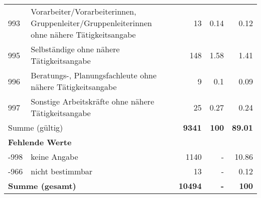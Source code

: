 \begin{longtable}{lXrrr}
        993 & \multicolumn{1}{X}{Vorarbeiter/Vorarbeiterinnen, Gruppenleiter/Gruppenleiterinnen ohne nähere Tätigkeitsangabe} & %
          \num{13} &
          \num[round-mode=places,round-precision=2]{0.14} &
          \num[round-mode=places,round-precision=2]{0.12} \\

        995 & \multicolumn{1}{X}{Selbständige ohne nähere Tätigkeitsangabe} & %
          \num{148} &
          \num[round-mode=places,round-precision=2]{1.58} &
          \num[round-mode=places,round-precision=2]{1.41} \\

        996 & \multicolumn{1}{X}{Beratungs-, Planungsfachleute ohne nähere Tätigkeitsangabe} & %
          \num{9} &
          \num[round-mode=places,round-precision=2]{0.1} &
          \num[round-mode=places,round-precision=2]{0.09} \\

        997 & \multicolumn{1}{X}{Sonstige Arbeitskräfte ohne nähere Tätigkeitsangabe} & %
          \num{25} &
          \num[round-mode=places,round-precision=2]{0.27} &
          \num[round-mode=places,round-precision=2]{0.24} \\

     \midrule
     \multicolumn{2}{l}{Summe (gültig)} &
       \textbf{\num{9341}} &
     \textbf{\num{100}} &
       \textbf{\num[round-mode=places,round-precision=2]{89.01}} \\
     \multicolumn{5}{l}{\textbf{Fehlende Werte}}\\
       -998 &
       keine Angabe &
         \num{1140} &
        - &
         \num[round-mode=places,round-precision=2]{10.86} \\
       -966 &
       nicht bestimmbar &
         \num{13} &
        - &
         \num[round-mode=places,round-precision=2]{0.12} \\
     \midrule
     \multicolumn{2}{l}{\textbf{Summe (gesamt)}} &
          \textbf{\num{10494}} &
        \textbf{-} &
        \textbf{\num{100}} \\
     \bottomrule
     \end{longtable}
     
